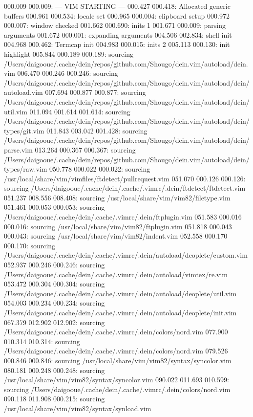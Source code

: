 000.009  000.009: --- VIM STARTING ---
000.427  000.418: Allocated generic buffers
000.961  000.534: locale set
000.965  000.004: clipboard setup
000.972  000.007: window checked
001.662  000.690: inits 1
001.671  000.009: parsing arguments
001.672  000.001: expanding arguments
004.506  002.834: shell init
004.968  000.462: Termcap init
004.983  000.015: inits 2
005.113  000.130: init highlight
005.844  000.189  000.189: sourcing /Users/daigooue/.cache/dein/repos/github.com/Shougo/dein.vim/autoload/dein.vim
006.470  000.246  000.246: sourcing /Users/daigooue/.cache/dein/repos/github.com/Shougo/dein.vim/autoload/dein/autoload.vim
007.694  000.877  000.877: sourcing /Users/daigooue/.cache/dein/repos/github.com/Shougo/dein.vim/autoload/dein/util.vim
011.094  001.614  001.614: sourcing /Users/daigooue/.cache/dein/repos/github.com/Shougo/dein.vim/autoload/dein/types/git.vim
011.843  003.042  001.428: sourcing /Users/daigooue/.cache/dein/repos/github.com/Shougo/dein.vim/autoload/dein/parse.vim
013.264  000.367  000.367: sourcing /Users/daigooue/.cache/dein/repos/github.com/Shougo/dein.vim/autoload/dein/types/raw.vim
050.778  000.022  000.022: sourcing /usr/local/share/vim/vimfiles/ftdetect/pullrequest.vim
051.070  000.126  000.126: sourcing /Users/daigooue/.cache/dein/.cache/.vimrc/.dein/ftdetect/ftdetect.vim
051.237  008.556  008.408: sourcing /usr/local/share/vim/vim82/filetype.vim
051.461  000.053  000.053: sourcing /Users/daigooue/.cache/dein/.cache/.vimrc/.dein/ftplugin.vim
051.583  000.016  000.016: sourcing /usr/local/share/vim/vim82/ftplugin.vim
051.818  000.043  000.043: sourcing /usr/local/share/vim/vim82/indent.vim
052.558  000.170  000.170: sourcing /Users/daigooue/.cache/dein/.cache/.vimrc/.dein/autoload/deoplete/custom.vim
052.937  000.246  000.246: sourcing /Users/daigooue/.cache/dein/.cache/.vimrc/.dein/autoload/vimtex/re.vim
053.472  000.304  000.304: sourcing /Users/daigooue/.cache/dein/.cache/.vimrc/.dein/autoload/deoplete/util.vim
054.003  000.234  000.234: sourcing /Users/daigooue/.cache/dein/.cache/.vimrc/.dein/autoload/deoplete/init.vim
067.379  012.902  012.902: sourcing /Users/daigooue/.cache/dein/.cache/.vimrc/.dein/colors/nord.vim
077.900  010.314  010.314: sourcing /Users/daigooue/.cache/dein/.cache/.vimrc/.dein/colors/nord.vim
079.526  000.846  000.846: sourcing /usr/local/share/vim/vim82/syntax/syncolor.vim
080.181  000.248  000.248: sourcing /usr/local/share/vim/vim82/syntax/syncolor.vim
090.022  011.693  010.599: sourcing /Users/daigooue/.cache/dein/.cache/.vimrc/.dein/colors/nord.vim
090.118  011.908  000.215: sourcing /usr/local/share/vim/vim82/syntax/synload.vim
